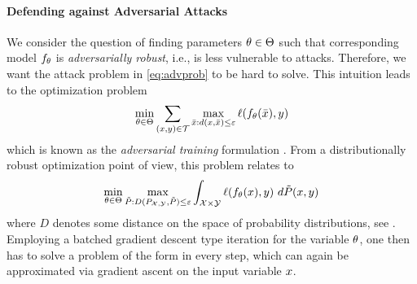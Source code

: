 \paragraph{Defending against Adversarial Attacks}
%
%
We consider the question of finding parameters $\theta\in\Theta$ such that corresponding model $f_\theta$ is \emph{adversarially robust}, i.e., is less vulnerable to attacks. Therefore, we want the attack problem in \cref{eq:advprob} to be hard to solve. This intuition leads to the optimization problem
%
\begin{align*}
\min_{\theta\in\Theta} \sum_{(x,y)\in \mathcal{T}} \max_{\bar{x}:d(x,\bar{x})\leq\varepsilon} \ell(f_\theta(\bar{x}), y)
\end{align*}
%
which is known as the \emph{adversarial training} formulation \cite{kurakin2016adversarial2, madry2017towards}. From a distributionally robust optimization point of view, this problem relates to 
%
\begin{align*}
\min_{\param\in\Param} \max_{\tilde P: D(P_{\Inp,\Oup}, \tilde P)\leq\budget} \int_{\Inp\times\Oup} \ell(\net_\param(\inp), \oup)\ d\tilde{P}(\inp,\oup)
\end{align*}
%
where $D$ denotes some distance on the space of probability distributions, see \cite{bungert2023geometry}. Employing a batched gradient descent type iteration for the variable $\theta$, one then has to solve a problem of the form  in every step, which can again be approximated via gradient ascent on the input variable $x$.
%
%
%
